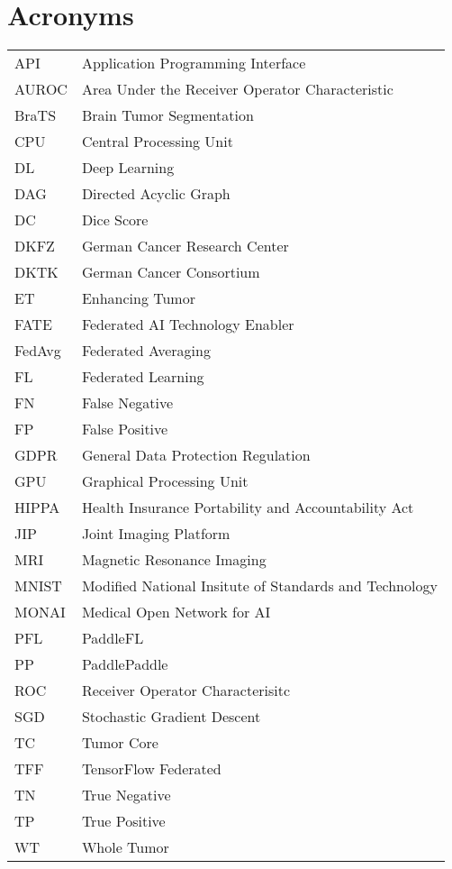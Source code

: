 \section*{Acronyms}
\begin{table}[H]
    \begin{tabular}{p{4cm} p{10cm}}
     API    & Application Programming Interface \\
     AUROC  & Area Under the Receiver Operator Characteristic \\
     BraTS  & Brain Tumor Segmentation \\
     CPU    & Central Processing Unit \\
     DL     & Deep Learning \\
     DAG    & Directed Acyclic Graph \\
     DC     & Dice Score \\
     DKFZ   & German Cancer Research Center \\
     DKTK   & German Cancer Consortium \\
     ET     & Enhancing Tumor \\
     FATE   & Federated AI Technology Enabler \\
     FedAvg & Federated Averaging \\
     FL     & Federated Learning \\
     FN     & False Negative \\
     FP     & False Positive \\
     GDPR   & General Data Protection Regulation \\
     GPU    & Graphical Processing Unit \\
     HIPPA  & Health Insurance Portability and Accountability Act \\
     JIP    & Joint Imaging Platform \\
     MRI    & Magnetic Resonance Imaging \\
     MNIST  & Modified National Insitute of Standards and Technology \\
     MONAI  & Medical Open Network for AI \\
     PFL    & PaddleFL \\
     PP     & PaddlePaddle \\
     ROC    & Receiver Operator Characterisitc \\
     SGD    & Stochastic Gradient Descent \\
     TC     & Tumor Core \\
     TFF    & TensorFlow Federated \\
     TN     & True Negative \\
     TP     & True Positive \\
     WT     & Whole Tumor
    \end{tabular}%
\end{table}%
